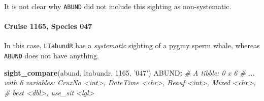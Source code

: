 \documentclass[
]{book}
\newenvironment{Shaded}{\begin{snugshade}}{\end{snugshade}}
\newcommand{\CommentTok}[1]{\textcolor[rgb]{0.56,0.35,0.01}{\textit{#1}}}
\newcommand{\DecValTok}[1]{\textcolor[rgb]{0.00,0.00,0.81}{#1}}
\newcommand{\KeywordTok}[1]{\textcolor[rgb]{0.13,0.29,0.53}{\textbf{#1}}}
\newcommand{\NormalTok}[1]{#1}
\newcommand{\OperatorTok}[1]{\textcolor[rgb]{0.81,0.36,0.00}{\textbf{#1}}}
\newcommand{\StringTok}[1]{\textcolor[rgb]{0.31,0.60,0.02}{#1}}
\begin{document}
It is not clear why \texttt{ABUND} did not include this sighting as non-systematic.

\hypertarget{cruise-1165-species-047}{%
\paragraph{Cruise 1165, Species 047}\label{cruise-1165-species-047}}

In this case, \texttt{LTabundR} has a \emph{systematic} sighting of a pygmy sperm whale, whereas \texttt{ABUND} does not have anything.

\begin{Shaded}
\begin{Highlighting}[]
\KeywordTok{sight_compare}\NormalTok{(abund, ltabundr, }\DecValTok{1165}\NormalTok{, }\StringTok{'047'}\NormalTok{)}
\NormalTok{ABUND}\OperatorTok{:}
\CommentTok{# A tibble: 0 x 6}
\CommentTok{# ... with 6 variables: CruzNo <int>, DateTime <chr>, Beauf <int>, Mixed <chr>,}
\CommentTok{#   best <dbl>, use_sit <lgl>}


\end{Highlighting}
\end{Shaded}
\end{document}
